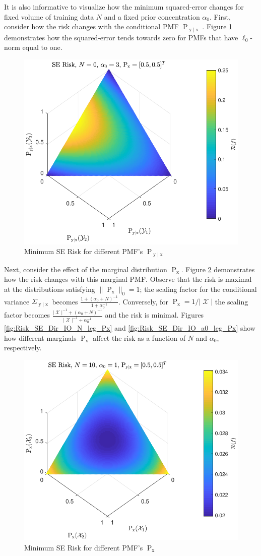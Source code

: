 \documentclass[12pt]{report}
\DeclareMathOperator{\xrm}{\mathrm{x}}
\DeclareMathOperator{\yrm}{\mathrm{y}}
\DeclareMathOperator{\Prm}{\mathrm{P}}
\DeclareMathOperator{\Xcal}{\mathcal{X}}
\begin{document}
It is also informative to visualize how the minimum squared-error changes for fixed volume of training data $N$ and a fixed prior concentration $\alpha_0$. First, consider how the risk changes with the conditional PMF $\Prm_{\yrm | \xrm}$. Figure \ref{fig:Risk_SE_Dir_IO_Pyx} demonstrates how the squared-error tends towards zero for PMFs that have $\ell_0$-norm equal to one.
\begin{figure}
\centering
\includegraphics[width=0.7\linewidth]{Risk_SE_Dir_IO_Pyx.pdf}
\caption{Minimum SE Risk for different PMF's $\Prm_{\yrm | \xrm}$}
\label{fig:Risk_SE_Dir_IO_Pyx}
\end{figure}

Next, consider the effect of the marginal distribution $\Prm_{\xrm}$. Figure \ref{fig:Risk_SE_Dir_IO_Px_N_10_a0_1} demonstrates how the risk changes with this marginal PMF. Observe that the risk is maximal at the distributions satisfying $\| \Prm_{\xrm} \|_0 = 1$; the scaling factor for the conditional variance $\Sigma_{\yrm | \xrm}$ becomes $\frac{1 + (\alpha_0+N)^{-1}}{1 + \alpha_0^{-1}}$. Conversely, for $\Prm_{\xrm} = 1/|\Xcal|$ the scaling factor becomes $\frac{|\Xcal|^{-1} + (\alpha_0+N)^{-1}}{|\Xcal|^{-1} + \alpha_0^{-1}}$ and the risk is minimal. Figures \ref{fig:Risk_SE_Dir_IO_N_leg_Px} and \ref{fig:Risk_SE_Dir_IO_a0_leg_Px} show how different marginals $\Prm_{\xrm}$ affect the risk as a function of $N$ and $\alpha_0$, respectively.

\begin{figure}
\centering
\includegraphics[width=0.7\linewidth]{Risk_SE_Dir_IO_Px_N_10_a0_1.pdf}
\caption{Minimum SE Risk for different PMF's $\Prm_{\xrm}$}
\label{fig:Risk_SE_Dir_IO_Px_N_10_a0_1}
\end{figure}
\end{document}
